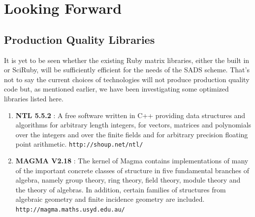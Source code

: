\documentclass[11pt, letterpaper, oneside]{article}
\begin{document}



\section{Looking Forward}

	\subsection{Production Quality Libraries}
	It is yet to be seen whether the existing Ruby matrix libraries, either the built in or SciRuby, 
	will be sufficiently efficient for the needs of the SADS scheme. That's not to say the current 
	choices of technologies will not produce production quality code but, as mentioned earlier, we have
	been investigating some optimized libraries listed here.

	\begin{enumerate}
	\item \textbf{NTL 5.5.2} : A free software written in C++ providing data structures and algorithms for arbitrary length integers, for vectors, matrices and polynomials over the integers and over the finite fields and for arbitrary precision floating point arithmetic. \texttt{http://shoup.net/ntl/}
	\item \textbf{MAGMA V2.18} : The kernel of Magma contains implementations of many of the important concrete classes of structure in five fundamental branches of algebra, namely group theory, ring theory, field theory, module theory and the theory of algebras.
	In addition, certain families of structures from algebraic geometry and finite incidence geometry are included. \texttt{http://magma.maths.usyd.edu.au/}
	\end{enumerate}

	
\end{document}
